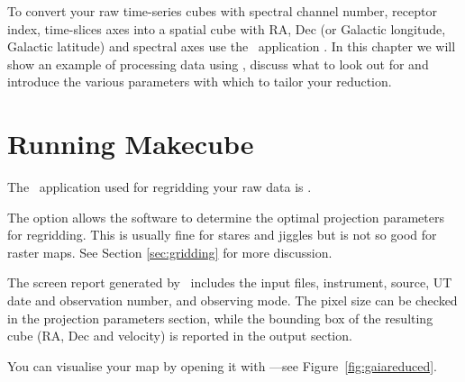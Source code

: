 \documentclass[11pt,oneside,chapters]{starlink}
\begin{document}
To convert your raw time-series cubes with spectral channel number,
receptor index, time-slices axes into a spatial cube with RA, Dec (or
Galactic longitude, Galactic latitude) and spectral axes use the
\smurf\ application \makecube. In this chapter we will show an example
of processing data using \makecube, discuss what to look out for and
introduce the various parameters with which to tailor your reduction.


\section{Running Makecube}
The \smurf\ application used for regridding your raw data is \makecube.

The  option allows the software to determine the
optimal projection parameters for regridding.  This is usually fine
for stares and jiggles but is not so good for raster maps.  See
Section \ref{sec:gridding} for more discussion.

The screen report generated by \makecube\ includes the input files,
instrument, source, UT date and observation number, and observing
mode. The pixel size can be checked in the projection parameters
section, while the bounding box of the resulting cube (RA, Dec and
velocity) is reported in the output section.

You can visualise your map by opening it with \gaia---see
Figure~\ref{fig:gaiareduced}.
\end{document}
